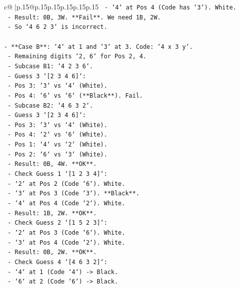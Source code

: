 \documentclass{article}
\begin{document}
{\begin{supertabular}{c@{$\;$}|p{.15\linewidth}@{}p{.15\linewidth}p{.15\linewidth}p{.15\linewidth}p{.15\linewidth}p{.15\linewidth}}
{{{\texttt{        {-} `4` at Pos 4 (Code has `3`). White.} \\
\texttt{        {-} Result: 0B, 3W. **Fail**. We need 1B, 2W.} \\
\texttt{      {-} So `4 6 2 3` is incorrect.} \\
\\ 
\texttt{{-} **Case B**: `4` at 1 and `3` at 3. Code: `4 x 3 y`.} \\
\texttt{  {-} Remaining digits `2, 6` for Pos 2, 4.} \\
\texttt{  {-} Subcase B1: `4 2 3 6`.} \\
\texttt{    {-} Guess 3 `{[}2 3 4 6{]}`:} \\
\texttt{      {-} Pos 3: `3` vs `4` (White).} \\
\texttt{      {-} Pos 4: `6` vs `6` (**Black**). Fail.} \\
\texttt{  {-} Subcase B2: `4 6 3 2`.} \\
\texttt{    {-} Guess 3 `{[}2 3 4 6{]}`:} \\
\texttt{      {-} Pos 3: `3` vs `4` (White).} \\
\texttt{      {-} Pos 4: `2` vs `6` (White).} \\
\texttt{      {-} Pos 1: `4` vs `2` (White).} \\
\texttt{      {-} Pos 2: `6` vs `3` (White).} \\
\texttt{      {-} Result: 0B, 4W. **OK**.} \\
\texttt{    {-} Check Guess 1 `{[}1 2 3 4{]}`:} \\
\texttt{      {-} `2` at Pos 2 (Code `6`). White.} \\
\texttt{      {-} `3` at Pos 3 (Code `3`). **Black**.} \\
\texttt{      {-} `4` at Pos 4 (Code `2`). White.} \\
\texttt{      {-} Result: 1B, 2W. **OK**.} \\
\texttt{    {-} Check Guess 2 `{[}1 5 2 3{]}`:} \\
\texttt{      {-} `2` at Pos 3 (Code `6`). White.} \\
\texttt{      {-} `3` at Pos 4 (Code `2`). White.} \\
\texttt{      {-} Result: 0B, 2W. **OK**.} \\
\texttt{    {-} Check Guess 4 `{[}4 6 3 2{]}`:} \\
\texttt{      {-} `4` at 1 (Code `4`) {-}> Black.} \\
\texttt{      {-} `6` at 2 (Code `6`) {-}> Black.} \\
}}}
\end{supertabular}}
\end{document}
